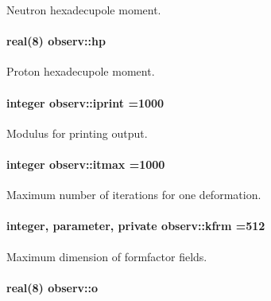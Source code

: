 Neutron hexadecupole moment. 

\paragraph[{\texorpdfstring{hp}{hp}}]{\setlength{\rightskip}{0pt plus 5cm}real(8) observ\+::hp}\hypertarget{namespaceobserv_a5fc280880094ef531157b9000331c609}{}\label{namespaceobserv_a5fc280880094ef531157b9000331c609}


Proton hexadecupole moment. 

\paragraph[{\texorpdfstring{iprint}{iprint}}]{\setlength{\rightskip}{0pt plus 5cm}integer observ\+::iprint =1000}\hypertarget{namespaceobserv_ad0ee4417f363898a68c79a49c0de9280}{}\label{namespaceobserv_ad0ee4417f363898a68c79a49c0de9280}


Modulus for printing output. 

\paragraph[{\texorpdfstring{itmax}{itmax}}]{\setlength{\rightskip}{0pt plus 5cm}integer observ\+::itmax =1000}\hypertarget{namespaceobserv_a1c1ca20926be13c61016d6ee42c77212}{}\label{namespaceobserv_a1c1ca20926be13c61016d6ee42c77212}


Maximum number of iterations for one deformation. 

\paragraph[{\texorpdfstring{kfrm}{kfrm}}]{\setlength{\rightskip}{0pt plus 5cm}integer, parameter, private observ\+::kfrm =512\hspace{0.3cm}{\ttfamily [private]}}\hypertarget{namespaceobserv_a644f1914424441bcad6f350dc0fe327c}{}\label{namespaceobserv_a644f1914424441bcad6f350dc0fe327c}


Maximum dimension of formfactor fields. 

\paragraph[{\texorpdfstring{o}{o}}]{\setlength{\rightskip}{0pt plus 5cm}real(8) observ\+::o}\hypertarget{namespaceobserv_af518f12cf84a544107605bba80b46749}{}\label{namespaceobserv_af518f12cf84a544107605bba80b46749}



